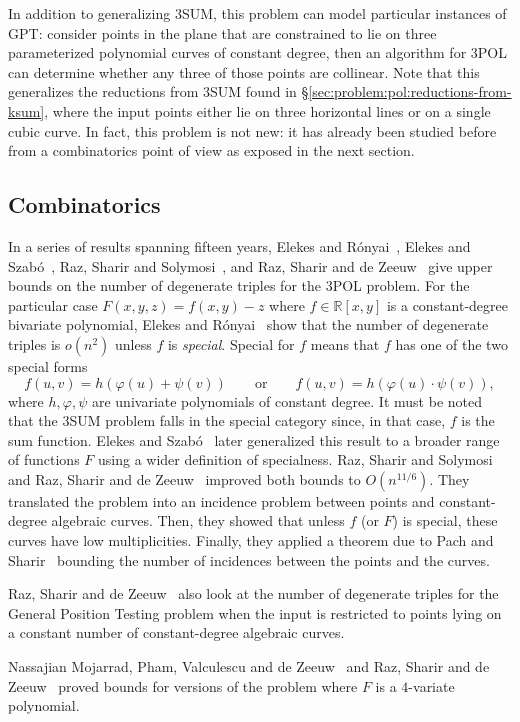 In addition to generalizing 3SUM, this problem can model particular
instances of GPT: consider points in the plane that are constrained to
lie on three parameterized polynomial curves of constant degree, then an
algorithm for 3POL can determine whether any three of those points are
collinear. Note that this generalizes the reductions from 3SUM found in
\S\ref{sec:problem:pol:reductions-from-ksum}, where the input points either lie
on three horizontal lines or on a single cubic curve.
%
In fact, this problem is not new: it has already been studied before from a
combinatorics point of view as exposed in the next section.

\subsection{Combinatorics}%
\label{sec:problem:pol:combinatorics}

In a series of results spanning fifteen years,
Elekes and Rónyai~\cite{ER00},
Elekes and Szabó~\cite{ES12},
Raz, Sharir and Solymosi~\cite{RSS14}, and
Raz, Sharir and de Zeeuw~\cite{RSZ15}
give upper bounds on the number of degenerate triples for the 3POL problem.
%
For the particular case $F(x,y,z) = f(x,y) - z$ where $f \in \mathbb{R}[x,y]$
is a constant-degree bivariate polynomial, Elekes and Rónyai~\cite{ER00} show
that the number of degenerate triples is $o(n^2)$ unless $f$ is
\emph{special}. Special for $f$ means that $f$ has one of the two special forms
\begin{displaymath}
f(u,v)=h(\varphi(u)+\psi(v))
\qquad
\text{or}
\qquad
f(u,v)=h(\varphi(u)\cdot\psi(v)),
\end{displaymath}
where $h,\varphi,\psi$ are univariate polynomials of constant degree.
It must be noted that the 3SUM problem falls in the special category since, in
that case, \( f \) is the sum function.
%
Elekes and Szabó~\cite{ES12} later generalized this result to a broader range
of functions $F$ using a wider definition of specialness.
%
Raz, Sharir and Solymosi~\cite{RSS14} and Raz, Sharir and de Zeeuw~\cite{RSZ15}
improved both bounds to $O(n^{11/6})$.
%
They translated the problem into an incidence problem between points and
constant-degree algebraic curves. Then, they showed that unless $f$ (or $F$) is
special, these curves have low multiplicities. Finally, they applied a theorem
due to Pach and Sharir~\cite{PS98} bounding the number of incidences between
the points and the curves.
%


Raz, Sharir and de Zeeuw~\cite{RSZ15} also look at the number of degenerate
triples for the General Position Testing problem when the input is restricted
to points lying on a constant number of constant-degree algebraic curves.
%


Nassajian Mojarrad, Pham, Valculescu and de Zeeuw~\cite{MPVd16} and
Raz, Sharir and de Zeeuw~\cite{RSZ16} proved bounds for versions of the
problem where $F$ is a $4$-variate polynomial.
